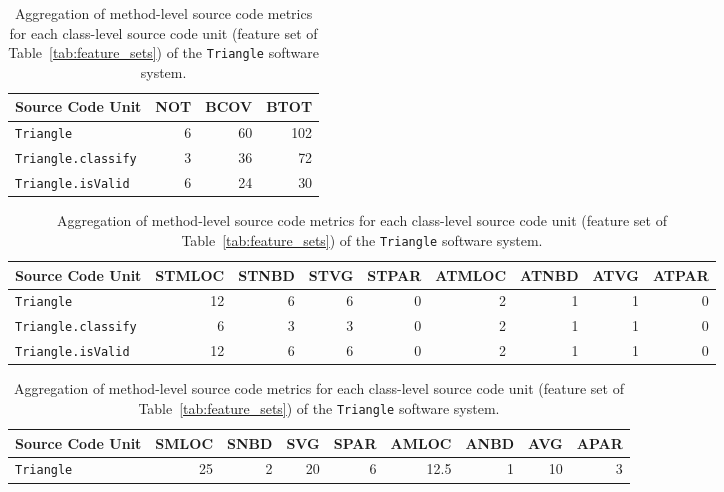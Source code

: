 \begin{table}
  \centering
	\caption{Extracted coverage test suite metrics (feature set  of Table~\ref{tab:feature_sets}) of the \texttt{Triangle} software system.}
	\label{tab:triangle_coverage_metrics}
	\begin{tabular}{|l|r|r|r|}
  	\hline
  	\rowcolor[RGB]{169,196,223}
  	\textbf{Source Code Unit} & \textbf{NOT} & \textbf{BCOV} & \textbf{BTOT} \\
  	\hline \texttt{Triangle} & 6 & 60 & 102 \\
  	\hline \texttt{Triangle.classify} & 3 & 36 & 72 \\
  	\hline \texttt{Triangle.isValid} & 6 & 24 & 30 \\
  	\hline
	\end{tabular}
	
	\vspace{3em}
	
	\centering
	\caption{Merged test suite metrics (feature set  in Table~\ref{tab:feature_sets}) for each source code unit of the \texttt{Triangle} software system.}
	\label{tab:triangle_merge_test_metrics}
	\begin{tabular}{|l|r|r|r|r|r|r|r|r|}
  	\hline
  	\rowcolor[RGB]{169,196,223}
  	\textbf{Source Code Unit} & \textbf{STMLOC} & \textbf{STNBD} & \textbf{STVG} & \textbf{STPAR} & \textbf{ATMLOC} & \textbf{ATNBD} & \textbf{ATVG} & \textbf{ATPAR}  \\
  	\hline \texttt{Triangle} & 12 & 6 & 6 & 0 & 2 & 1 & 1 & 0 \\
  	\hline \texttt{Triangle.classify} & 6 & 3 & 3 & 0 & 2 & 1 & 1 & 0 \\
  	\hline \texttt{Triangle.isValid} & 12 & 6 & 6 & 0 & 2 & 1 & 1 & 0 \\
  	\hline
	\end{tabular}

	\vspace{3em}

	\centering
	\caption{Aggregation of method-level source code metrics for each class-level source code unit (feature set  of Table~\ref{tab:feature_sets}) of the \texttt{Triangle} software system.}
	\label{tab:triangle_aggregate_metrics}
	\begin{tabular}{|l|r|r|r|r|r|r|r|r|}
  	\hline
  	\rowcolor[RGB]{169,196,223}
  	\textbf{Source Code Unit} & \textbf{SMLOC} & \textbf{SNBD} & \textbf{SVG} & \textbf{SPAR} & \textbf{AMLOC} & \textbf{ANBD} & \textbf{AVG} & \textbf{APAR}  \\
  	\hline \texttt{Triangle} & 25 & 2 & 20 & 6 & 12.5 & 1 & 10 & 3 \\
  	\hline
	\end{tabular}
\end{table}
\afterpage\clearpage


